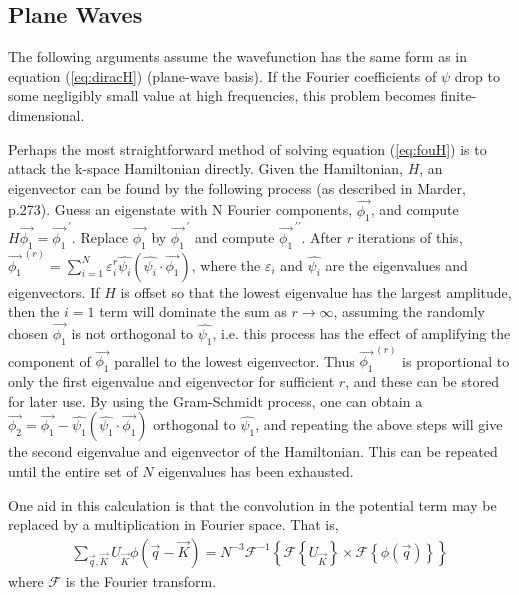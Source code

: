 \documentclass[12pt]{article}
\begin{document}
\subsection{Plane Waves}
\par The following arguments assume the wavefunction has the same form as in equation (\ref{eq:diracH}) (plane-wave basis). If the Fourier coefficients of $\psi$ drop to some negligibly small value at high frequencies, this problem becomes finite-dimensional.
\par Perhaps the most straightforward method of solving equation (\ref{eq:fouH}) is to attack the k-space Hamiltonian directly. Given the Hamiltonian, $H$, an eigenvector can be found by the following process (as described in Marder, p.273)\cite{text}.
Guess an eigenstate with N Fourier components, $\vec{\phi_1}$, and compute $H \vec{\phi_1} = \vec{\phi_1}^{\, \prime}$.
Replace $\vec{\phi_1}$ by $\vec{\phi_1}^{\, \prime}$ and compute $\vec{\phi_1}^{\, \prime\prime}$.
 After $r$ iterations of this, $\vec{\phi_1} ^{\, (r)} = \sum_{i=1}^N \varepsilon_i^r \hat{\psi_i}(\hat{\psi_i} \cdot \vec{\phi_1})$, where the $\varepsilon_i$ and $\hat{\psi_i}$ are the eigenvalues and eigenvectors.
If $H$ is offset so that the lowest eigenvalue has the largest amplitude, then the $i=1$ term will dominate the sum as $r \rightarrow \infty$, assuming the randomly chosen $\vec{\phi_1}$ is not orthogonal to $\hat{\psi_1}$, i.e. this process has the effect of amplifying the component of $\vec{\phi_1}$ parallel to the lowest eigenvector. Thus $\vec{\phi_1} ^{\, (r)}$ is proportional to only the first eigenvalue and eigenvector for sufficient $r$, and these can be stored for later use. By using the Gram-Schmidt process, one can obtain a $\vec{\phi_2} = \vec{\phi_1} - \hat{\psi_1}(\hat{\psi_1} \cdot \vec{\phi_1})$ orthogonal to $\hat{\psi_1}$, and repeating the above steps will give the second eigenvalue and eigenvector of the Hamiltonian. This can be repeated until the entire set of $N$ eigenvalues has been exhausted.
\par One aid in this calculation is that the convolution in the potential term may be replaced by a multiplication in Fourier space. That is,
\begin{align*}
\sum_{\vec{q},\vec{K}} U_{\vec{K}} \phi (\vec{q} - \vec{K}) = N^{-3} \mathcal{F}^{-1}\left\lbrace \mathcal{F}\left\lbrace U_{\vec{K}} \right\rbrace \times \mathcal{F}\left\lbrace \phi(\vec{q}) \right\rbrace \right\rbrace
\end{align*}
where $\mathcal{F}$ is the Fourier transform. 
\end{document}
